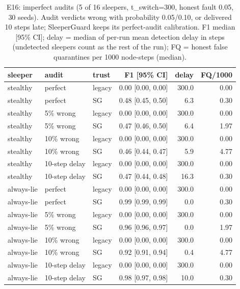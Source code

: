 \begin{table}[t]
\centering\footnotesize\setlength{\tabcolsep}{3pt}
\caption{E16: imperfect audits (5 of 16 sleepers, t\_switch=300, honest fault 0.05, 30 seeds). Audit verdicts wrong with probability 0.05/0.10, or delivered 10 steps late; SleeperGuard keeps its perfect-audit calibration. F1 median [95\% CI]; delay = median of per-run mean detection delay in steps (undetected sleepers count as the rest of the run); FQ = honest false quarantines per 1000 node-steps (median).}\label{tab:e16}
\begin{tabular}{lllrrr}
\toprule
sleeper & audit & trust & F1 [95\% CI] & delay & FQ/1000 \\
\midrule
stealthy & perfect & legacy & 0.00 [0.00, 0.00] & 300.0 & 0.00 \\
stealthy & perfect & SG & 0.48 [0.45, 0.50] & 6.3 & 0.30 \\
stealthy & 5\% wrong & legacy & 0.00 [0.00, 0.00] & 300.0 & 0.00 \\
stealthy & 5\% wrong & SG & 0.47 [0.46, 0.50] & 6.4 & 1.97 \\
stealthy & 10\% wrong & legacy & 0.00 [0.00, 0.00] & 300.0 & 0.00 \\
stealthy & 10\% wrong & SG & 0.46 [0.44, 0.47] & 5.9 & 4.77 \\
stealthy & 10-step delay & legacy & 0.00 [0.00, 0.00] & 300.0 & 0.00 \\
stealthy & 10-step delay & SG & 0.47 [0.44, 0.48] & 16.3 & 0.30 \\
always-lie & perfect & legacy & 0.00 [0.00, 0.00] & 300.0 & 0.00 \\
always-lie & perfect & SG & 0.99 [0.99, 0.99] & 0.0 & 0.30 \\
always-lie & 5\% wrong & legacy & 0.00 [0.00, 0.00] & 300.0 & 0.00 \\
always-lie & 5\% wrong & SG & 0.96 [0.96, 0.97] & 0.0 & 1.97 \\
always-lie & 10\% wrong & legacy & 0.00 [0.00, 0.00] & 300.0 & 0.00 \\
always-lie & 10\% wrong & SG & 0.92 [0.91, 0.94] & 0.4 & 4.77 \\
always-lie & 10-step delay & legacy & 0.00 [0.00, 0.00] & 300.0 & 0.00 \\
always-lie & 10-step delay & SG & 0.98 [0.97, 0.98] & 10.0 & 0.30 \\
\bottomrule
\end{tabular}
\end{table}
